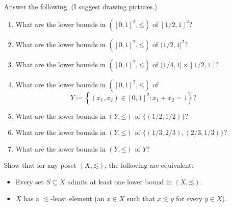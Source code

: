\begin{exercise}
	\label{exercise:lb-R2}
	Answer the following. (I suggest drawing pictures.)
	
	\begin{enumerate}[label=(\alph*)]
	
		\item \label{item:lb_R2:a} What are the lower bounds in $\left([0,1]^2,\mathord{\leq}\right)$ of $[1/2,1]^2$?

		\item \label{item:lb_R2:b} What are the lower bounds in $\left([0,1]^2,\mathord{\leq}\right)$ of $(1/2,1]^2$?

		\item \label{item:lb_R2:c} What are the lower bounds in $\left([0,1]^2,\mathord{\leq}\right)$ of $(1/4,1] \times [1/2,1]$?


		\item \label{item:lb_R2:d} What are the lower bounds in $\left([0,1]^2,\mathord{\leq}\right)$ of
		\begin{equation*}
			Y \coloneqq \left\{ (x_1,x_2) \in [0,1]^2 : x_1 + x_2 = 1 \right\} ?
		\end{equation*}

		\item \label{item:lb_R2:e} What are the lower bounds in $(Y,\mathord{\leq})$ of $\{(1/2,1/2)\}$?

		\item \label{item:lb_R2:f} What are the lower bounds in $(Y,\mathord{\leq})$ of $\{(1/3,2/3),(2/3,1/3)\}$?

		\item \label{item:lb_R2:g} What are the lower bounds in $(Y,\mathord{\leq})$ of $Y$?
	
	\end{enumerate}
\end{exercise}

\begin{exercise}
	\label{exercise:lb_exist}
	Show that for any poset $(X,\mathord{\lesssim})$, the following are equivalent:

	\begin{itemize}
	
		\item Every set $S \subseteq X$ admits at least one lower bound in $(X,\mathord{\lesssim})$.

		\item $X$ has a $\lesssim$-least element (an $x \in X$ such that $x \lesssim y$ for every $y \in X$).
	
	\end{itemize}
\end{exercise}

